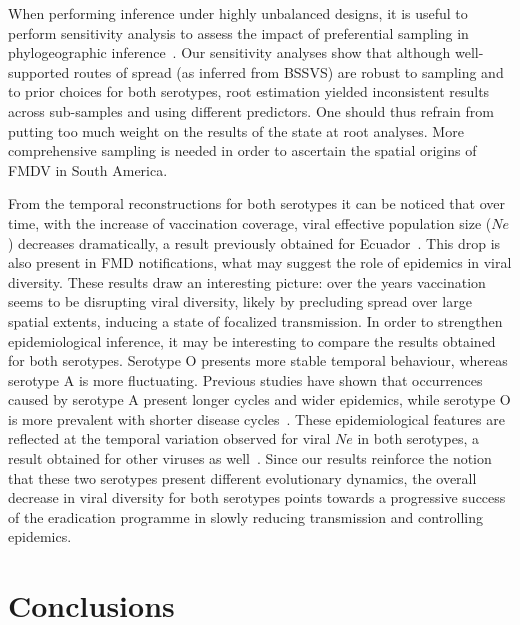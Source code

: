 \documentclass[10pt]{article}
\begin{document}

When performing inference under highly unbalanced designs, it is useful to perform sensitivity analysis to assess the impact of preferential sampling in phylogeographic inference~\cite{Faria2012, polar, fluPNAS}. 
Our sensitivity analyses show that although well-supported routes of spread (as inferred from BSSVS) are robust to sampling and to prior choices for both serotypes, root estimation yielded inconsistent results across sub-samples and using different predictors.
One should thus refrain from putting too much weight on the results of the state at root analyses. 
More comprehensive sampling is needed in order to ascertain the spatial origins of FMDV in South America.

From the temporal reconstructions for both serotypes it can be noticed that over time, with the increase of vaccination coverage, viral effective population size ($Ne$) decreases dramatically, a result previously obtained for Ecuador~\cite{Carvalho2013}.
This drop is also present in FMD notifications, what may suggest the role of epidemics in viral diversity.
These results draw an interesting picture: over the years vaccination seems to be disrupting viral diversity, likely by precluding spread over large spatial extents, inducing a state of focalized transmission.
In order to strengthen epidemiological inference, it may be interesting to compare the results obtained for both serotypes.
Serotype O presents more stable temporal behaviour, whereas serotype A is more fluctuating.
Previous studies have shown that occurrences caused by serotype A present longer cycles and wider epidemics, while serotype O is more prevalent with shorter disease cycles~\cite{colombiatime}.
These epidemiological features are reflected at the temporal variation observed for viral $Ne$ in both serotypes, a result obtained for other viruses as well~\cite{Bennett2010,Pybus2003}. 
Since our results reinforce the notion that these two serotypes present different evolutionary dynamics, the overall decrease in viral diversity for both serotypes points towards a progressive success of the eradication programme in slowly reducing transmission and controlling epidemics.


\section*{Conclusions}
\end{document}
